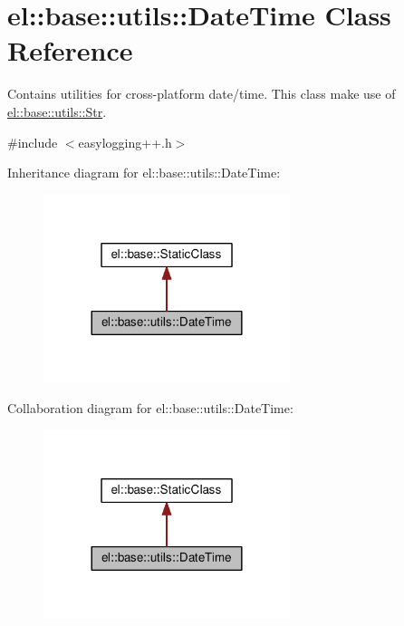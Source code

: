\hypertarget{classel_1_1base_1_1utils_1_1_date_time}{}\section{el\+:\+:base\+:\+:utils\+:\+:Date\+Time Class Reference}
\label{classel_1_1base_1_1utils_1_1_date_time}


Contains utilities for cross-\/platform date/time. This class make use of \hyperlink{classel_1_1base_1_1utils_1_1_str}{el\+::base\+::utils\+::\+Str}.  




{\ttfamily \#include $<$easylogging++.\+h$>$}



Inheritance diagram for el\+:\+:base\+:\+:utils\+:\+:Date\+Time\+:
\nopagebreak
\begin{figure}[H]
\begin{center}
\leavevmode
\includegraphics[width=204pt]{classel_1_1base_1_1utils_1_1_date_time__inherit__graph}
\end{center}
\end{figure}


Collaboration diagram for el\+:\+:base\+:\+:utils\+:\+:Date\+Time\+:
\nopagebreak
\begin{figure}[H]
\begin{center}
\leavevmode
\includegraphics[width=204pt]{classel_1_1base_1_1utils_1_1_date_time__coll__graph}
\end{center}
\end{figure}
